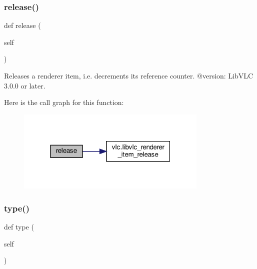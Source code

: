 \subsubsection{\texorpdfstring{release()}{release()}}
{\footnotesize\ttfamily def release (\begin{DoxyParamCaption}\item[{}]{self }\end{DoxyParamCaption})}

\begin{DoxyVerb}Releases a renderer item, i.e. decrements its reference counter.
@version: LibVLC 3.0.0 or later.
\end{DoxyVerb}
 Here is the call graph for this function\+:
\nopagebreak
\begin{figure}[H]
\begin{center}
\leavevmode
\includegraphics[width=259pt]{classvlc_1_1_renderer_a4cd51e19135e5ad4a19eae3ea9c60537_cgraph}
\end{center}
\end{figure}
\mbox{\label{classvlc_1_1_renderer_aff464267544e4efc9b770c8320c8f199}} 
\subsubsection{\texorpdfstring{type()}{type()}}
{\footnotesize\ttfamily def type (\begin{DoxyParamCaption}\item[{}]{self }\end{DoxyParamCaption})}


